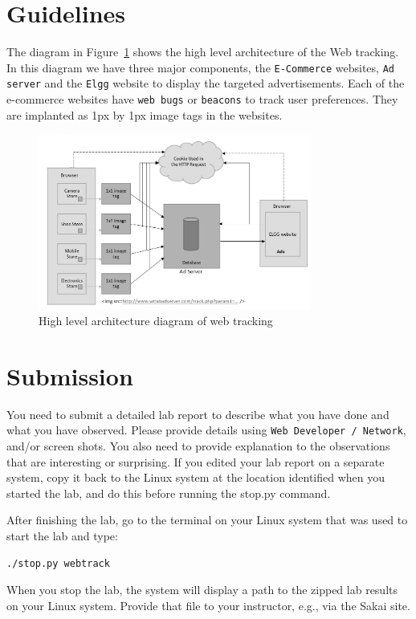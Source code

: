 \section{Guidelines}

The diagram in Figure~\ref{fig:guideline_figure} shows the high level architecture of the Web tracking. 
In this diagram we have three major components, the {\tt E-Commerce} websites, {\tt Ad server} and the {\tt Elgg} website to display the targeted advertisements. 
Each of the e-commerce websites have {\tt web bugs} or {\tt beacons} to track user preferences. 
They are implanted as 1px by 1px image tags in the websites.

	\begin{figure}
	\centering
	\includegraphics[width=0.8\textwidth,natwidth=621,natheight=403]{Figs/Guidelinefigure.jpg}
	\caption{High level architecture diagram of web tracking} 
	\label{fig:guideline_figure}
	\end{figure}


\section{Submission}

You need to submit a detailed lab report to describe what you have
done and what you have observed. Please provide details using 
{\tt Web Developer / Network}, and/or screen shots. 
You also need to provide explanation
to the observations that are interesting or surprising.
If you edited your lab report on a separate system, copy it back to the Linux system at the location
identified when you started the lab, and do this before running the stop.py command.

After finishing the lab, go to the terminal on your Linux system that was used to start the lab and type:
\begin{verbatim}
./stop.py webtrack
\end{verbatim}
When you stop the lab, the system will display a path to the zipped lab results on your Linux system.  Provide that file to
your instructor, e.g., via the Sakai site.


